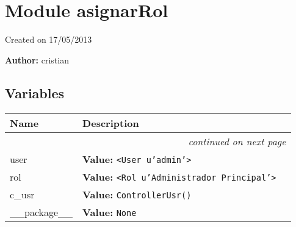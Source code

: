 %
%
%


\section{Module asignarRol}

    \label{asignarRol}
Created on 17/05/2013

\textbf{Author:} cristian





  \subsection{Variables}

    \vspace{-1cm}
\hspace{\varindent}\begin{longtable}{|p{\varnamewidth}|p{\vardescrwidth}|l}
\cline{1-2}
\cline{1-2} \centering \textbf{Name} & \centering \textbf{Description}& \\
\cline{1-2}
\endhead\cline{1-2}\multicolumn{3}{r}{\small\textit{continued on next page}}\\\endfoot\cline{1-2}
\endlastfoot\raggedright u\-s\-e\-r\- & \raggedright \textbf{Value:} 
{\tt {\textless}User u'admin'{\textgreater}}&\\
\cline{1-2}
\raggedright r\-o\-l\- & \raggedright \textbf{Value:} 
{\tt {\textless}Rol u'Administrador Principal'{\textgreater}}&\\
\cline{1-2}
\raggedright c\-\_\-u\-s\-r\- & \raggedright \textbf{Value:} 
{\tt ControllerUsr()}&\\
\cline{1-2}
\raggedright \_\-\_\-p\-a\-c\-k\-a\-g\-e\-\_\-\_\- & \raggedright \textbf{Value:} 
{\tt None}&\\
\cline{1-2}
\end{longtable}

